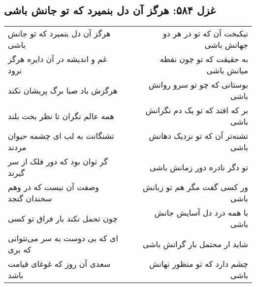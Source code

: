 \begin{center}
\section*{غزل ۵۸۴: هرگز آن دل بنمیرد که تو جانش باشی}
\label{sec:584}
\begin{longtable}{l p{0.5cm} r}
هرگز آن دل بنمیرد که تو جانش باشی
&&
نیکبخت آن که تو در هر دو جهانش باشی
\\
غم و اندیشه در آن دایره هرگز نرود
&&
به حقیقت که تو چون نقطه میانش باشی
\\
هرگزش باد صبا برگ پریشان نکند
&&
بوستانی که چو تو سرو روانش باشی
\\
همه عالم نگران تا نظر بخت بلند
&&
بر که افتد که تو یک دم نگرانش باشی
\\
تشنگانت به لب ای چشمه حیوان مردند
&&
تشنه‌تر آن که تو نزدیک دهانش باشی
\\
گر توان بود که دور فلک از سر گیرند
&&
تو دگر نادره دور زمانش باشی
\\
وصفت آن نیست که در وهم سخندان گنجد
&&
ور کسی گفت مگر هم تو زبانش باشی
\\
چون تحمل نکند بار فراق تو کسی
&&
با همه درد دل آسایش جانش باشی
\\
ای که بی دوست به سر می‌نتوانی که بری
&&
شاید ار محتمل بار گرانش باشی
\\
سعدی آن روز که غوغای قیامت باشد
&&
چشم دارد که تو منظور نهانش باشی
\\
\end{longtable}
\end{center}
